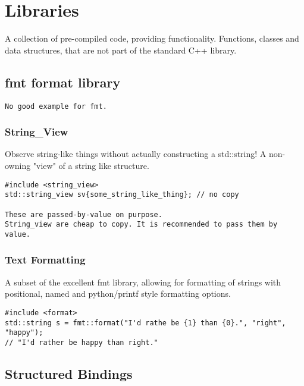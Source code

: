 \chapter{Libraries}

A collection of pre-compiled code, providing functionality. Functions, classes and data structures,
that are not part of the standard C++ library.

\section{fmt format library}

\begin{verbatim}
No good example for fmt.
\end{verbatim}
\subsection{String\_View}

Observe string-like things without actually constructing a std::string!
A non-owning "view" of a string like structure.

\begin{verbatim}
#include <string_view>
std::string_view sv{some_string_like_thing}; // no copy

These are passed-by-value on purpose.
String_view are cheap to copy. It is recommended to pass them by value.
\end{verbatim}

\subsection{Text Formatting}

A subset of the excellent {fmt} library, allowing for formatting of strings with positional,
named and python/printf style formatting options.

\begin{verbatim}
#include <format>
std::string s = fmt::format("I'd rathe be {1} than {0}.", "right", "happy");
// "I'd rather be happy than right."
\end{verbatim}

\section{Structured Bindings}

